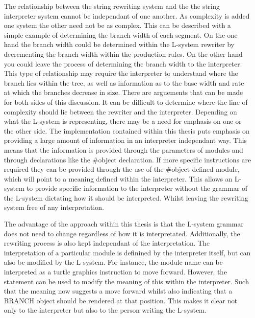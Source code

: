 
The relationship between the string rewriting system and the the string interpreter system cannot be independant of one another. As complexity is added one system the other need not be as complex. This can be described with a simple example of determining the branch width of each segment. On the one hand the branch width could be determined within the L-system rewriter by decrementing the branch width within the production rules. On the other hand you could leave the process of determining the branch width to the interpreter. This type of relationship may require the interpreter to understand where the branch lies within the tree, as well as information as to the base width and rate at which the branches decrease in size. There are arguements that can be made for both sides of this discussion. It can be difficult to determine where the line of complexity should lie between the rewriter and the interpreter. Depending on what the L-system is representing, there may be a need for emphasis on one or the other side. The implementation contained within this thesis puts emphasis on providing a large amount of information in an interpreter independant way. This means that the information is provided through the parameters of modules and through declarations like the \#object declaration. If more specific instructions are required they can be provided through the use of the \#object defined module, which will point to a meaning defined within the interpreter. This allows an L-system to provide specific information to the interpreter without the grammar of the L-system dictating how it should be interpreted. Whilst leaving the rewriting system free of any interpretation.

The advantage of the approach within this thesis is that the L-system grammar does not need to change regardless of how it is interpretated. Additionally, the rewriting process is also kept independant of the interpretation. The interpretation of a particular module is definined by the interpreter itself, but can also be modified by the L-system. For instance, the module name  can be interpreted as a turtle graphics instruction to move forward. However, the statement  can be used to modify the meaning of this within the interpreter. Such that the meaning now suggests a move forward whilst also indicating that a BRANCH object should be rendered at that position. This makes it clear not only to the interpreter but also to the person writing the L-system.